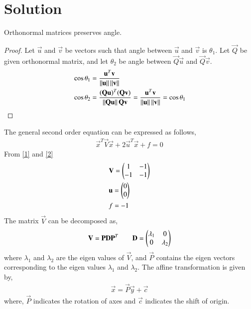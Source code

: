 \documentclass[journal,12pt,twocolumn]{IEEEtran}
\begin{document}
\section{Solution}
\begin{lemma}\label{4}
	Orthonormal matrices preserves angle.
\begin{proof}
	Let $\vec{u}$ and $\vec{v}$ be vectors such that angle between $\vec{u}$ and $\vec{v}$ is $\theta_1$. Let $\vec{Q}$ be given orthonormal matrix, and let $\theta_2$ be angle between $\vec{Q}\vec{u}$ and $\vec{Q}\vec{v}$.
\begin{align}
& \cos\theta_1 = \frac{\mathbf{u}^T\mathbf{v}}{\left\lVert\mathbf{u}\right\rVert\left\lVert\mathbf{v}\right\rVert} \\
& \cos\theta_2 = \frac{(\mathbf{Q}\mathbf{u})^T(\mathbf{Q}\mathbf{v})}{\left\lVert\mathbf{Q}\mathbf{u}\right\rVert\mathbf{Q}\mathbf{v}}= \frac{\mathbf{u}^T\mathbf{v}}{\left\lVert\mathbf{u}\right\rVert\left\lVert\mathbf{v}\right\rVert} = \cos\theta_1
\end{align}
\end{proof}
\end{lemma}
The general second order equation can be expressed as follows,
\begin{align}
	\vec{x}^T\vec{V}\vec{x} + 2\vec{u}^T\vec{x} + f = 0 \label{2}
\end{align}
From \eqref{1} and \eqref{2}
\begin{align}
	& \mathbf{V} = \begin{pmatrix}1 & -1 \\ -1 & -1\end{pmatrix} \\
	& \mathbf{u} = \begin{pmatrix}0 \\0\end{pmatrix}\\
	& f = -1
\end{align}
The matrix $\vec{V}$ can be decomposed as,
\begin{align}
	\mathbf V= \mathbf{P}\mathbf{D}\mathbf{P}^T \qquad \mathbf{D} = \begin{pmatrix}\lambda_1 & 0 \\ 0 & \lambda_2\end{pmatrix}
\end{align}
where $\lambda_1$ and $\lambda_2$ are the eigen values of $\vec{V}$, and $\vec{P}$ contains the eigen vectors corresponding to the eigen values $\lambda_1$ and $\lambda_2$. The affine transformation is given by,
\begin{align}
	\vec{x} = \vec{P}\vec{y} + \vec{c}
\end{align}
where, $\vec{P}$ indicates the rotation of axes and $\vec{c}$ indicates the shift of origin.
\end{document}
